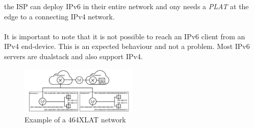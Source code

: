 \documentclass[format=sigconf, natbib=true, nonacm=true]{acmart}
\begin{document}
the ISP can deploy IPv6 in their entire network and ony needs a \textit{PLAT} at the edge to a connecting IPv4 network.\\\\It is important to note that it is not possible to reach an IPv6 client from an IPv4 end-device. This is an expected behaviour and not a problem. Most IPv6 servers are dualstack and also support IPv4.
    \begin{figure}
        \centering
        \includegraphics[width=0.5\textwidth]{images/464_xlat.png}
        \caption{Example of a 464XLAT network}
        \label{fig:646_XLAT}
    \end{figure}
\end{document}
